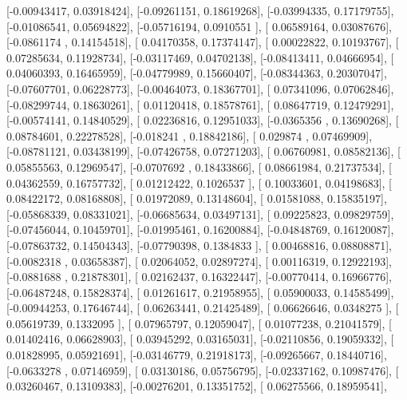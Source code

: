 \documentclass{article}
\begin{document}
       [-0.00943417,  0.03918424],
       [-0.09261151,  0.18619268],
       [-0.03994335,  0.17179755],
       [-0.01086541,  0.05694822],
       [-0.05716194,  0.0910551 ],
       [ 0.06589164,  0.03087676],
       [-0.0861174 ,  0.14154518],
       [ 0.04170358,  0.17374147],
       [ 0.00022822,  0.10193767],
       [ 0.07285634,  0.11928734],
       [-0.03117469,  0.04702138],
       [-0.08413411,  0.04666954],
       [ 0.04060393,  0.16465959],
       [-0.04779989,  0.15660407],
       [-0.08344363,  0.20307047],
       [-0.07607701,  0.06228773],
       [-0.00464073,  0.18367701],
       [ 0.07341096,  0.07062846],
       [-0.08299744,  0.18630261],
       [ 0.01120418,  0.18578761],
       [ 0.08647719,  0.12479291],
       [-0.00574141,  0.14840529],
       [ 0.02236816,  0.12951033],
       [-0.0365356 ,  0.13690268],
       [ 0.08784601,  0.22278528],
       [-0.018241  ,  0.18842186],
       [ 0.029874  ,  0.07469909],
       [-0.08781121,  0.03438199],
       [-0.07426758,  0.07271203],
       [ 0.06760981,  0.08582136],
       [ 0.05855563,  0.12969547],
       [-0.0707692 ,  0.18433866],
       [ 0.08661984,  0.21737534],
       [ 0.04362559,  0.16757732],
       [ 0.01212422,  0.1026537 ],
       [ 0.10033601,  0.04198683],
       [ 0.08422172,  0.08168808],
       [ 0.01972089,  0.13148604],
       [ 0.01581088,  0.15835197],
       [-0.05868339,  0.08331021],
       [-0.06685634,  0.03497131],
       [ 0.09225823,  0.09829759],
       [-0.07456044,  0.10459701],
       [-0.01995461,  0.16200884],
       [-0.04848769,  0.16120087],
       [-0.07863732,  0.14504343],
       [-0.07790398,  0.1384833 ],
       [ 0.00468816,  0.08808871],
       [-0.0082318 ,  0.03658387],
       [ 0.02064052,  0.02897274],
       [ 0.00116319,  0.12922193],
       [-0.0881688 ,  0.21878301],
       [ 0.02162437,  0.16322447],
       [-0.00770414,  0.16966776],
       [-0.06487248,  0.15828374],
       [ 0.01261617,  0.21958955],
       [ 0.05900033,  0.14585499],
       [-0.00944253,  0.17646744],
       [ 0.06263441,  0.21425489],
       [ 0.06626646,  0.0348275 ],
       [ 0.05619739,  0.1332095 ],
       [ 0.07965797,  0.12059047],
       [ 0.01077238,  0.21041579],
       [ 0.01402416,  0.06628903],
       [ 0.03945292,  0.03165031],
       [-0.02110856,  0.19059332],
       [ 0.01828995,  0.05921691],
       [-0.03146779,  0.21918173],
       [-0.09265667,  0.18440716],
       [-0.0633278 ,  0.07146959],
       [ 0.03130186,  0.05756795],
       [-0.02337162,  0.10987476],
       [ 0.03260467,  0.13109383],
       [-0.00276201,  0.13351752],
       [ 0.06275566,  0.18959541],
\end{document}
